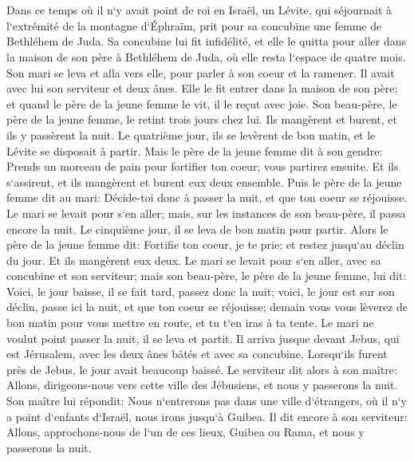 \chapter{}

\verse Dans ce temps où il n`y avait point de roi en Israël, un Lévite, qui séjournait à l`extrémité de la montagne d`Éphraïm, prit pour sa concubine une femme de Bethléhem de Juda. 
\verse Sa concubine lui fit infidélité, et elle le quitta pour aller dans la maison de son père à Bethléhem de Juda, où elle resta l`espace de quatre mois. 
\verse Son mari se leva et alla vers elle, pour parler à son coeur et la ramener. Il avait avec lui son serviteur et deux ânes. Elle le fit entrer dans la maison de son père; et quand le père de la jeune femme le vit, il le reçut avec joie. 
\verse Son beau-père, le père de la jeune femme, le retint trois jours chez lui. Ils mangèrent et burent, et ils y passèrent la nuit. 
\verse Le quatrième jour, ils se levèrent de bon matin, et le Lévite se disposait à partir. Mais le père de la jeune femme dit à son gendre: Prends un morceau de pain pour fortifier ton coeur; vous partirez ensuite. 
\verse Et ils s`assirent, et ils mangèrent et burent eux deux ensemble. Puis le père de la jeune femme dit au mari: Décide-toi donc à passer la nuit, et que ton coeur se réjouisse. 
\verse Le mari se levait pour s`en aller; mais, sur les instances de son beau-père, il passa encore la nuit. 
\verse Le cinquième jour, il se leva de bon matin pour partir. Alors le père de la jeune femme dit: Fortifie ton coeur, je te prie; et restez jusqu`au déclin du jour. Et ils mangèrent eux deux. 
\verse Le mari se levait pour s`en aller, avec sa concubine et son serviteur; mais son beau-père, le père de la jeune femme, lui dit: Voici, le jour baisse, il se fait tard, passez donc la nuit; voici, le jour est sur son déclin, passe ici la nuit, et que ton coeur se réjouisse; demain vous vous lèverez de bon matin pour vous mettre en route, et tu t`en iras à ta tente. 
\verse Le mari ne voulut point passer la nuit, il se leva et partit. Il arriva jusque devant Jebus, qui est Jérusalem, avec les deux ânes bâtés et avec sa concubine. 
\verse Lorsqu`ils furent près de Jebus, le jour avait beaucoup baissé. Le serviteur dit alors à son maître: Allons, dirigeons-nous vers cette ville des Jébusiens, et nous y passerons la nuit. 
\verse Son maître lui répondit: Nous n`entrerons pas dans une ville d`étrangers, où il n`y a point d`enfants d`Israël, nous irons jusqu`à Guibea. 
\verse Il dit encore à son serviteur: Allons, approchons-nous de l`un de ces lieux, Guibea ou Rama, et nous y passerons la nuit. 
